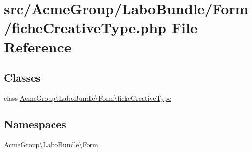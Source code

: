 \hypertarget{fiche_creative_type_8php}{\section{src/\+Acme\+Group/\+Labo\+Bundle/\+Form/fiche\+Creative\+Type.php File Reference}
\label{fiche_creative_type_8php}
}
\subsection*{Classes}
\begin{DoxyCompactItemize}
\item 
class \hyperlink{class_acme_group_1_1_labo_bundle_1_1_form_1_1fiche_creative_type}{Acme\+Group\textbackslash{}\+Labo\+Bundle\textbackslash{}\+Form\textbackslash{}fiche\+Creative\+Type}
\end{DoxyCompactItemize}
\subsection*{Namespaces}
\begin{DoxyCompactItemize}
\item 
 \hyperlink{namespace_acme_group_1_1_labo_bundle_1_1_form}{Acme\+Group\textbackslash{}\+Labo\+Bundle\textbackslash{}\+Form}
\end{DoxyCompactItemize}
